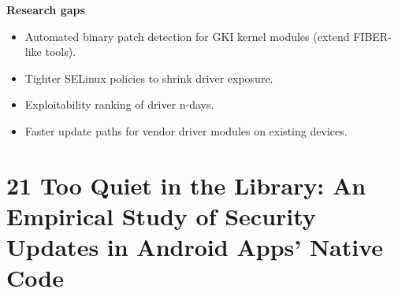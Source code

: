 \documentclass[11pt,a4paper]{article}
\begin{document}
\begin{enumerate}
    \vspace{4pt}
    \textbf{Research gaps}
    \begin{itemize}
        \item Automated binary patch detection for GKI kernel modules (extend FIBER-like tools).
        \item Tighter SELinux policies to shrink driver exposure.
        \item Exploitability ranking of driver n-days.
        \item Faster update paths for vendor driver modules on existing devices.
    \end{itemize}

\end{enumerate}

\newpage

\section{21 Too Quiet in the Library: An Empirical Study of Security Updates in Android Apps' Native Code}
\end{document}
